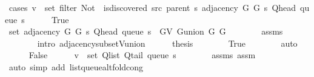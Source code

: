 \begin{isabellebody}
\ {\isacharparenleft}{\kern0pt}cases\ {\isachardoublequoteopen}v\ {\isasymin}\ set\ {\isacharparenleft}{\kern0pt}filter\ {\isacharparenleft}{\kern0pt}Not\ {\isasymcirc}\ is{\isacharunderscore}{\kern0pt}discovered\ src\ {\isacharparenleft}{\kern0pt}parent\ s{\isacharparenright}{\kern0pt}{\isacharparenright}{\kern0pt}\ {\isacharparenleft}{\kern0pt}adjacency\ G{}\ G{}\ s\ {\isacharparenleft}{\kern0pt}Q{\isacharunderscore}{\kern0pt}head\ {\isacharparenleft}{\kern0pt}queue\ s{\isacharparenright}{\kern0pt}{\isacharparenright}{\kern0pt}{\isacharparenright}{\kern0pt}{\isacharparenright}{\kern0pt}{\isachardoublequoteclose}{\isacharparenright}{\kern0pt}\isanewline
\ \ \ \ \isamarkupfalse%
\ True\isanewline
\ \ \ \ \isamarkupfalse%
\ {\isachardoublequoteopen}set\ {\isacharparenleft}{\kern0pt}adjacency\ G{}\ G{}\ s\ {\isacharparenleft}{\kern0pt}Q{\isacharunderscore}{\kern0pt}head\ {\isacharparenleft}{\kern0pt}queue\ s{\isacharparenright}{\kern0pt}{\isacharparenright}{\kern0pt}{\isacharparenright}{\kern0pt}\ {\isasymsubseteq}\ G{\isachardot}{\kern0pt}V\ {\isacharparenleft}{\kern0pt}G{\isachardot}{\kern0pt}union\ G{}\ G{}{\isacharparenright}{\kern0pt}{\isachardoublequoteclose}\isanewline
\ \ \ \ \ \ \isamarkupfalse%
\ assms{\isacharparenleft}{\kern0pt}{}{\isacharcomma}{\kern0pt}\ {}{\isacharparenright}{\kern0pt}\isanewline
\ \ \ \ \ \ \isamarkupfalse%
\ {\isacharparenleft}{\kern0pt}intro\ adjacency{\isacharunderscore}{\kern0pt}subset{\isacharunderscore}{\kern0pt}V{\isacharunderscore}{\kern0pt}union{\isacharparenright}{\kern0pt}\isanewline
\ \ \ \ \isamarkupfalse%
\ {\isacharquery}{\kern0pt}thesis\isanewline
\ \ \ \ \ \ \isamarkupfalse%
\ True\isanewline
\ \ \ \ \ \ \isamarkupfalse%
\ auto\isanewline
\ \ \isamarkupfalse%
\isanewline
\ \ \ \ \isamarkupfalse%
\ False\isanewline
\ \ \ \ \isamarkupfalse%
\ {\isachardoublequoteopen}v\ {\isasymin}\ set\ {\isacharparenleft}{\kern0pt}Q{\isacharunderscore}{\kern0pt}list\ {\isacharparenleft}{\kern0pt}Q{\isacharunderscore}{\kern0pt}tail\ {\isacharparenleft}{\kern0pt}queue\ s{\isacharparenright}{\kern0pt}{\isacharparenright}{\kern0pt}{\isacharparenright}{\kern0pt}{\isachardoublequoteclose}\isanewline
\ \ \ \ \ \ \isamarkupfalse%
\ assms\ assm\isanewline
\ \ \ \ \ \ \isamarkupfalse%
\ {\isacharparenleft}{\kern0pt}auto\ simp\ add{\isacharcolon}{\kern0pt}\ list{\isacharunderscore}{\kern0pt}queue{\isacharunderscore}{\kern0pt}alt{\isacharunderscore}{\kern0pt}fold{\isacharunderscore}{\kern0pt}cong{\isacharparenright}{\kern0pt}\isanewline

\end{isabellebody}
